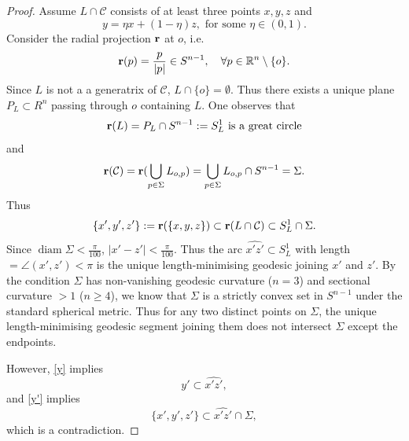 \documentclass[11pt,a4paper,reqno]{amsart}
\newcommand{\R}{\mathbb{R}}
\newcommand{\calC}{\mathcal{C}}
\newcommand{\1}{\mathbf{1}}
\newcommand{\diam}{\operatorname{diam}}
\numberwithin{equation}{section}
\theoremstyle{plain}
\theoremstyle{definition}
\theoremstyle{remark}
\begin{document}
\begin{proof}
   Assume $L \cap \calC$ consists of at least three points $x,y,z$ and
   \begin{equation}\label{y}
     y = \eta x+ (1- \eta)z, \mbox{ for some $\eta \in (0,1)$}.
   \end{equation}
    Consider the radial projection $\bf{r}$ at $o$, i.e.
    $${\bf r}(p) = \frac{p}{|p|} \in S^{n-1}, \quad \forall p \in \R^n\setminus \{o\}.$$
    Since $L$ is not a a generatrix of $\calC$, $L \cap \{o\} = \emptyset$. Thus there exists a unique plane $P_L \subset R^n$ passing through $o$ containing $L$.
    One observes that
    $$  {\bf r}(L) = P_L \cap S^{n-1} := S^1_L \mbox{ is a great circle}$$
    and
    $$  {\bf r}(\calC) = {\bf r}(\bigcup_{p \in \Sigma} L_{o,p}) = \bigcup_{p \in \Sigma}L_{o,p} \cap S^{n-1} = \Sigma.$$
    Thus
    \begin{equation}\label{y'}
      \{x',y',z'\} := {\bf r}(\{x,y,z\}) \subset {\bf r}(L \cap \calC) \subset S^1_L \cap \Sigma.
    \end{equation}
    Since $\diam \Sigma< \frac{\pi}{100}$, $|x'-z'|< \frac{\pi}{100}$. Thus the arc $\widehat{x'z'} \subset S^1_L$ with length $=\angle(x',z')< \pi$ is the unique length-minimising geodesic joining $x'$ and $z'$.
    By the condition $\Sigma$ has non-vanishing geodesic curvature ($n=3$) and sectional curvature $>1$ ($n \ge 4$), we know that
    $\Sigma$ is a strictly convex set in $S^{n-1}$ under the standard spherical metric. Thus for any two distinct points on $\Sigma$, the unique length-minimising geodesic segment joining them does not intersect $\Sigma$ except the endpoints.

However, \eqref{y} implies
$$ y' \subset \widehat{x'z'}, $$
and \eqref{y'} implies
$$ \{x',y',z'\}  \subset \widehat{x'z'} \cap \Sigma, $$
which is a contradiction.


\end{proof}
\end{document}
